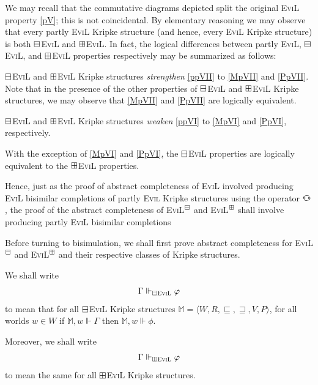 We may recall that the commutative diagrams depicted split
the original \textsc{EviL} property \ref{pV};  this is not coincidental.
By elementary reasoning we may observe that every 
partly \textsc{EviL} Kripke structure 
(and hence, every \textsc{EviL} Kripke structure) is  
both $\boxminus$\textsc{EviL} and $\boxplus$\textsc{EviL}.  In fact, the logical differences between partly
\textsc{EviL}, $\boxminus$\textsc{EviL}, and $\boxplus$\textsc{EviL} properties respectively may be summarized as follows:
\begin{bul}
\item $\boxminus$\textsc{EviL} and $\boxplus$\textsc{EviL} Kripke structures \emph{strengthen} \ref{ppVII} to
\ref{MpVII} and \ref{PpVII}.  Note that in the presence of the other properties
of $\boxminus$\textsc{EviL} and $\boxplus$\textsc{EviL} Kripke structures,
we may observe that \ref{MpVII} and \ref{PpVII} are logically equivalent.
\item $\boxminus$\textsc{EviL} and $\boxplus$\textsc{EviL} Kripke structures \emph{weaken} \ref{ppVI} to
\ref{MpVI} and \ref{PpVI}, respectively.
\item With the exception of \ref{MpVI} and
\ref{PpVI}, the $\boxminus$\textsc{EviL} properties are logically
equivalent to the $\boxplus$\textsc{EviL} properties.
\end{bul}

Hence, just as the proof of abstract completeness of \textsc{EviL}
involved producing \textsc{EviL} bisimilar completions of partly
\textsc{Evil} 
Kripke structures using the operator $\invis$, 
the proof of the abstract completeness of
\textsc{EviL}$^\boxminus$ and \textsc{EviL}$^\boxplus$ shall involve producing
partly \textsc{EviL} bisimilar completions

Before turning to bisimulation, we shall first prove abstract
completeness for \textsc{EviL}$^\boxminus$ and \textsc{EviL}$^\boxplus$ and their
respective classes of Kripke structures.

\begin{definition}\label{BM-BPEviL-Vdash}
We shall write
\[ \Gamma \Vdash_{\boxminus\textup{\textsc{EviL}}} \varphi \]
to mean that for all $\boxminus$\textsc{EviL}  Kripke structures
$\mathbb{M} = \langle W, R, \sqsubseteq, \sqsupseteq, V, P \rangle$,
for all worlds $w \in W$ if $\mathbb{M},w \Vdash \Gamma$ then
$\mathbb{M},w\Vdash \phi$.

Moreover, we shall write
\[ \Gamma \Vdash_{\boxplus\textup{\textsc{EviL}}} \varphi \]
to mean the same for all $\boxplus$\textsc{EviL}  Kripke structures.
\end{definition}

